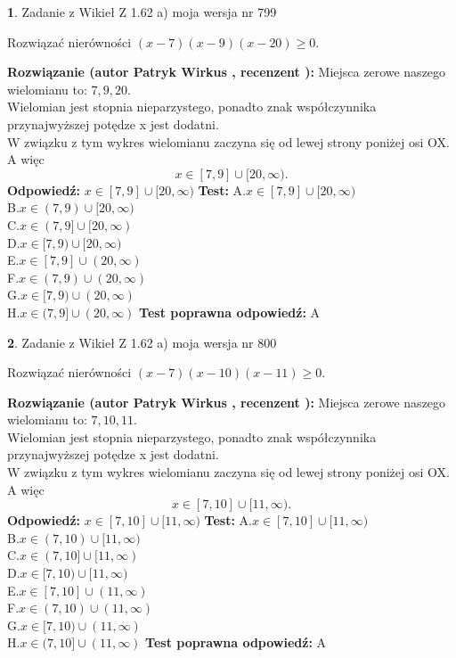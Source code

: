 \documentclass[12pt, a4paper]{article}
\theoremstyle{definition} %
\newtheorem{zad}{}
\newcommand{\zadStart}[1]{\begin{zad}#1\newline}
\newcommand{\zadStop}{\end{zad}}
\newcommand{\rozwStart}[2]{\noindent \textbf{Rozwiązanie (autor #1 , recenzent #2): }\newline}
\newcommand{\rozwStop}{\newline}
\newcommand{\odpStart}{\noindent \textbf{Odpowiedź:}\newline}
\newcommand{\odpStop}{\newline}
\newcommand{\testStart}{\noindent \textbf{Test:}\newline}
\newcommand{\testStop}{\newline}
\newcommand{\kluczStart}{\noindent \textbf{Test poprawna odpowiedź:}\newline}
\newcommand{\kluczStop}{\newline}
\begin{document}
\zadStart{Zadanie z Wikieł Z 1.62 a) moja wersja nr 799}

Rozwiązać nierówności $(x-7)(x-9)(x-20)\ge0$.
\zadStop
\rozwStart{Patryk Wirkus}{}
Miejsca zerowe naszego wielomianu to: $7, 9, 20$.\\
Wielomian jest stopnia nieparzystego, ponadto znak współczynnika przy\linebreak najwyższej potędze x jest dodatni.\\ W związku z tym wykres wielomianu zaczyna się od lewej strony poniżej osi OX. A więc $$x \in [7,9] \cup [20,\infty).$$
\rozwStop
\odpStart
$x \in [7,9] \cup [20,\infty)$
\odpStop
\testStart
A.$x \in [7,9] \cup [20,\infty)$\\
B.$x \in (7,9) \cup [20,\infty)$\\
C.$x \in (7,9] \cup [20,\infty)$\\
D.$x \in [7,9) \cup [20,\infty)$\\
E.$x \in [7,9] \cup (20,\infty)$\\
F.$x \in (7,9) \cup (20,\infty)$\\
G.$x \in [7,9) \cup (20,\infty)$\\
H.$x \in (7,9] \cup (20,\infty)$
\testStop
\kluczStart
A
\kluczStop



\zadStart{Zadanie z Wikieł Z 1.62 a) moja wersja nr 800}

Rozwiązać nierówności $(x-7)(x-10)(x-11)\ge0$.
\zadStop
\rozwStart{Patryk Wirkus}{}
Miejsca zerowe naszego wielomianu to: $7, 10, 11$.\\
Wielomian jest stopnia nieparzystego, ponadto znak współczynnika przy\linebreak najwyższej potędze x jest dodatni.\\ W związku z tym wykres wielomianu zaczyna się od lewej strony poniżej osi OX. A więc $$x \in [7,10] \cup [11,\infty).$$
\rozwStop
\odpStart
$x \in [7,10] \cup [11,\infty)$
\odpStop
\testStart
A.$x \in [7,10] \cup [11,\infty)$\\
B.$x \in (7,10) \cup [11,\infty)$\\
C.$x \in (7,10] \cup [11,\infty)$\\
D.$x \in [7,10) \cup [11,\infty)$\\
E.$x \in [7,10] \cup (11,\infty)$\\
F.$x \in (7,10) \cup (11,\infty)$\\
G.$x \in [7,10) \cup (11,\infty)$\\
H.$x \in (7,10] \cup (11,\infty)$
\testStop
\kluczStart
A
\kluczStop
\end{document}
